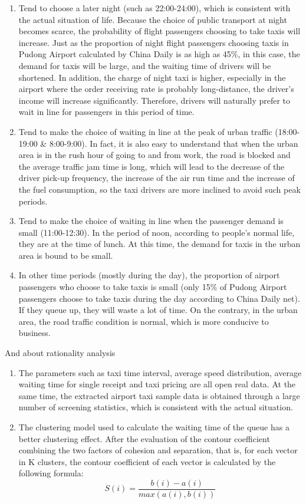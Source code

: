 \begin{enumerate}
\item Tend to choose a later night (such as 22:00-24:00), which is consistent with the actual situation of life. Because the choice of public transport at night becomes scarce, the probability of flight passengers choosing to take taxis will increase. Just as the proportion of night flight passengers choosing taxis in Pudong Airport calculated by China Daily is as high as 45\%, in this case, the demand for taxis will be large, and the waiting time of drivers will be shortened. In addition, the charge of night taxi is higher, especially in the airport where the order receiving rate is probably long-distance, the driver's income will increase significantly. Therefore, drivers will naturally prefer to wait in line for passengers in this period of time.
\item Tend to make the choice of waiting in line at the peak of urban traffic (18:00-19:00 \& 8:00-9:00). In fact, it is also easy to understand that when the urban area is in the rush hour of going to and from work, the road is blocked and the average traffic jam time is long, which will lead to the decrease of the driver pick-up frequency, the increase of the air run time and the increase of the fuel consumption, so the taxi drivers are more inclined to avoid such peak periods.
\item Tend to make the choice of waiting in line when the passenger demand is small (11:00-12:30). In the period of noon, according to people's normal life, they are at the time of lunch. At this time, the demand for taxis in the urban area is bound to be small.
\item  In other time periods (mostly during the day), the proportion of airport passengers who choose to take taxis is small (only 15\% of Pudong Airport passengers choose to take taxis during the day according to China Daily net). If they queue up, they will waste a lot of time. On the contrary, in the urban area, the road traffic condition is normal, which is more conducive to business.
\end{enumerate}
And about rationality analysis
\begin{enumerate}
\item The parameters such as taxi time interval, average speed distribution, average waiting time for single receipt and taxi pricing are all open real data. At the same time, the extracted airport taxi sample data is obtained through a large number of screening statistics, which is consistent with the actual situation.
\item The clustering model used to calculate the waiting time of the queue has a better clustering effect. After the evaluation of the contour coefficient combining the two factors of cohesion and separation, that is, for each vector in K clusters, the contour coefficient\cite{kaggleCompetition} of each vector is calculated by the following formula:
\begin{equation} S(i) = \frac{b(i)-a(i)}{max(a(i),b(i))}\end{equation}
\end{enumerate}

